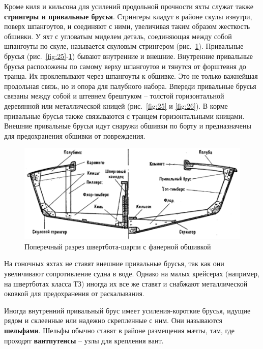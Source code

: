 \documentclass[a4paper, 12pt, twoside, final]{scrbook}
\begin{document}
Кроме киля и кильсона для усилений продольной прочности яхты служат
также \textbf{стрингеры и привальные брусья}. Стрингеры кладут в районе
скулы изнутри, поверх шпангоутов, и соединяют с ними, увеличивая таким
образом жесткость обшивки. У яхт с угловатым миделем деталь, соединяющая
между собой шпангоуты по скуле, называется скуловым стрингером (рис.~\ref{fig:28}).
Привальные брусья (рис.~\ref{fig:25}\--\ref{fig:28})
бывают внутренние и внешние. Внутренние привальные брусья расположены
по самому верху шпангоутов и тянутся от форштевня до транца. Их проклепывают
через шпангоуты к обшивке. Это не только важнейшая продольная связь,
но и опора для палубного набора. Впереди привальные брусья связаны
между собой и штевнем брештуком \--- толстой горизонтальной деревянной
или металлической кницей (рис.~\ref{fig:25}
и \ref{fig:26}).
В корме привальные брусья также связываются с транцем горизонтальными
кницами. Внешние привальные брусья идут снаружи обшивки по борту и
предназначены для предохранения обшивки от повреждения.

\begin{figure}[htbp]
\begin{centering}
\includegraphics{pics/Razrez_2}
\par\end{centering}

\protect\caption{\label{fig:28}Поперечный
разрез швертбота-шарпи с фанерной обшивкой}


\end{figure}


На гоночных яхтах не ставят внешние привальные брусья, так как они
увеличивают сопротивление судна в воде. Однако на малых крейсерах
(например, на швертботах класса ТЗ) иногда их все же ставят и снабжают
металлической оковкой для предохранения от раскалывания.

Иногда внутренний привальный брус имеет усиления-короткие брусья,
идущие рядом и склеенные или надежно скрепленные с ним. Они называются
\textbf{шельфами}. Шельфы обычно ставят в районе размещения мачты,
там, где проходят \textbf{вантпутенсы} \--- узлы для крепления вант.
\end{document}
